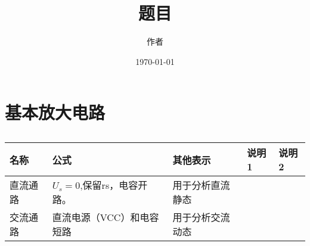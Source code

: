 \documentclass{article}
\title{题目}
\author{作者}
\date{\today}
\begin{document}
\maketitle
\newpage

\renewcommand{\baselinestretch}{1.35}
\tableofcontents
\newpage

\setlength{\parskip}{0em}
\renewcommand{\baselinestretch}{1.93}

\section{基本放大电路}

\begin{table}[H]
    \centering
    \begin{tabular}{|m{1.5cm}<{\centering}|m{3.5cm}<{\centering}|m{3cm}<{\centering}|m{4.8cm}<{\centering}|m{1.8cm}<{\centering}|}
    \hline
        名称 & 公式&其他表示 &说明1 &说明2\\ \hline
        直流通路&$U_s=0$,保留rs，电容开路。&用于分析直流静态&&\\ \hline 
        交流通路&直流电源（VCC）和电容短路&用于分析交流动态&&\\ \hline
        
      \end{tabular}
      \caption{}
    \end{table}
\end{document}
